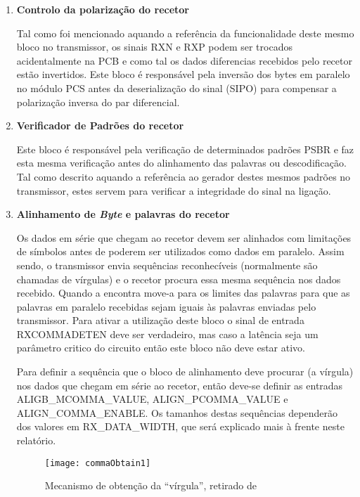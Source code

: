 \begin{enumerate}
	\item \textbf{Controlo da polarização do recetor}
	
	\hspace{1.0em}Tal como foi mencionado aquando a referência da funcionalidade deste mesmo bloco no transmissor, os sinais RXN e RXP podem ser trocados acidentalmente na PCB e como tal os dados diferencias recebidos pelo recetor estão invertidos. Este bloco é responsável pela inversão dos bytes em paralelo no módulo PCS antes da deserialização do sinal (SIPO) para compensar a polarização inversa do par diferencial.
	
	\item \textbf{Verificador de Padrões do recetor}
	
	\hspace{1.0em}Este bloco é responsável pela verificação de determinados padrões PSBR e faz esta mesma verificação antes do alinhamento das palavras ou descodificação. Tal como descrito aquando a referência ao gerador destes mesmos padrões no transmissor, estes servem para verificar a integridade do sinal na ligação.
	
	\item \textbf{Alinhamento de \textit{Byte} e palavras do recetor}
	
	\hspace{1.0em}Os dados em série que chegam ao recetor devem ser alinhados com limitações de símbolos antes de poderem ser utilizados como dados em paralelo. Assim sendo, o transmissor envia sequências reconhecíveis (normalmente são chamadas de vírgulas) e o recetor procura essa mesma sequência nos dados recebido. Quando a encontra move-a para os limites das palavras para que as palavras em paralelo recebidas sejam iguais às palavras enviadas pelo transmissor. Para ativar a utilização deste bloco o sinal de entrada RXCOMMADETEN deve ser verdadeiro, mas caso a latência seja um parâmetro critico do circuito então este bloco não deve estar ativo. 
	
	\hspace{1.0em}Para definir a sequência que o bloco de alinhamento deve procurar (a vírgula) nos dados que chegam em série ao recetor, então deve-se definir as entradas ALIGB\_MCOMMA\_VALUE, ALIGN\_PCOMMA\_VALUE e ALIGN\_COMMA\_ENABLE. Os tamanhos destas sequências dependerão dos valores em RX\_DATA\_WIDTH, que será explicado mais à frente neste relatório.
	
	\begin{figure}[h!]
		\begin{center}
			\leavevmode
			\texttt{[image: commaObtain1]}
			\caption{Mecanismo de obtenção da “vírgula”, retirado de \cite{R011}}
			\label{fig:comma1}
		\end{center}
	\end{figure}
	

\end{enumerate}
